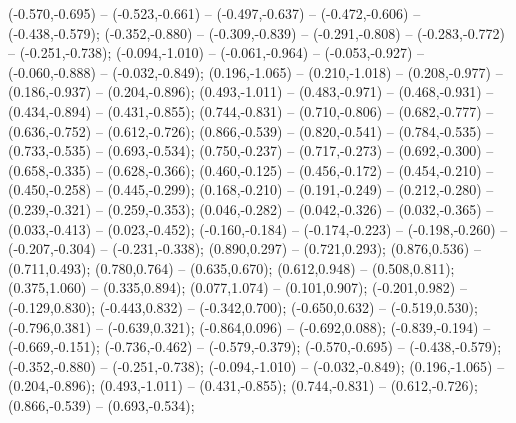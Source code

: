 {\begin{scope}
\begin{scope}[shift={(1.860,0)}]
 (-0.570,-0.695) -- (-0.523,-0.661) -- (-0.497,-0.637) -- (-0.472,-0.606) -- (-0.438,-0.579);
 (-0.352,-0.880) -- (-0.309,-0.839) -- (-0.291,-0.808) -- (-0.283,-0.772) -- (-0.251,-0.738);
 (-0.094,-1.010) -- (-0.061,-0.964) -- (-0.053,-0.927) -- (-0.060,-0.888) -- (-0.032,-0.849);
 (0.196,-1.065) -- (0.210,-1.018) -- (0.208,-0.977) -- (0.186,-0.937) -- (0.204,-0.896);
 (0.493,-1.011) -- (0.483,-0.971) -- (0.468,-0.931) -- (0.434,-0.894) -- (0.431,-0.855);
 (0.744,-0.831) -- (0.710,-0.806) -- (0.682,-0.777) -- (0.636,-0.752) -- (0.612,-0.726);
 (0.866,-0.539) -- (0.820,-0.541) -- (0.784,-0.535) -- (0.733,-0.535) -- (0.693,-0.534);
 (0.750,-0.237) -- (0.717,-0.273) -- (0.692,-0.300) -- (0.658,-0.335) -- (0.628,-0.366);
 (0.460,-0.125) -- (0.456,-0.172) -- (0.454,-0.210) -- (0.450,-0.258) -- (0.445,-0.299);
 (0.168,-0.210) -- (0.191,-0.249) -- (0.212,-0.280) -- (0.239,-0.321) -- (0.259,-0.353);
 (0.046,-0.282) -- (0.042,-0.326) -- (0.032,-0.365) -- (0.033,-0.413) -- (0.023,-0.452);
 (-0.160,-0.184) -- (-0.174,-0.223) -- (-0.198,-0.260) -- (-0.207,-0.304) -- (-0.231,-0.338);
 (0.890,0.297) -- (0.721,0.293);
 (0.876,0.536) -- (0.711,0.493);
 (0.780,0.764) -- (0.635,0.670);
 (0.612,0.948) -- (0.508,0.811);
 (0.375,1.060) -- (0.335,0.894);
 (0.077,1.074) -- (0.101,0.907);
 (-0.201,0.982) -- (-0.129,0.830);
 (-0.443,0.832) -- (-0.342,0.700);
 (-0.650,0.632) -- (-0.519,0.530);
 (-0.796,0.381) -- (-0.639,0.321);
 (-0.864,0.096) -- (-0.692,0.088);
 (-0.839,-0.194) -- (-0.669,-0.151);
 (-0.736,-0.462) -- (-0.579,-0.379);
 (-0.570,-0.695) -- (-0.438,-0.579);
 (-0.352,-0.880) -- (-0.251,-0.738);
 (-0.094,-1.010) -- (-0.032,-0.849);
 (0.196,-1.065) -- (0.204,-0.896);
 (0.493,-1.011) -- (0.431,-0.855);
 (0.744,-0.831) -- (0.612,-0.726);
 (0.866,-0.539) -- (0.693,-0.534);

\end{scope}
\end{scope}}
